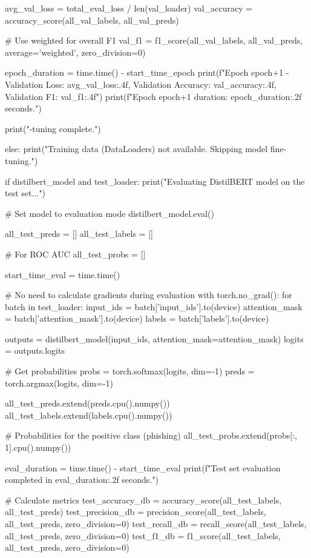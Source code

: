 \begin{ffcode}
        avg_val_loss = total_eval_loss / len(val_loader)
        val_accuracy = accuracy_score(all_val_labels, all_val_preds)

        # Use weighted for overall F1
        val_f1 = f1_score(all_val_labels, all_val_preds, average='weighted', zero_division=0)

        epoch_duration = time.time() - start_time_epoch
        print(f"Epoch {epoch+1} - Validation Loss: {avg_val_loss:.4f}, Validation Accuracy: {val_accuracy:.4f}, Validation F1: {val_f1:.4f}")
        print(f"Epoch {epoch+1} duration: {epoch_duration:.2f} seconds.")

    print("\nFine-tuning complete.")

else:
    print("Training data (DataLoaders) not available. Skipping model fine-tuning.")

if distilbert_model and test_loader:
    print("Evaluating DistilBERT model on the test set...")

    # Set model to evaluation mode
    distilbert_model.eval()

    all_test_preds = []
    all_test_labels = []

    # For ROC AUC
    all_test_probs = []

    start_time_eval = time.time()

    # No need to calculate gradients during evaluation
    with torch.no_grad():
        for batch in test_loader:
            input_ids = batch['input_ids'].to(device)
            attention_mask = batch['attention_mask'].to(device)
            labels = batch['labels'].to(device)

            outputs = distilbert_model(input_ids, attention_mask=attention_mask)
            logits = outputs.logits

            # Get probabilities
            probs = torch.softmax(logits, dim=-1)
            preds = torch.argmax(logits, dim=-1)

            all_test_preds.extend(preds.cpu().numpy())
            all_test_labels.extend(labels.cpu().numpy())

            # Probabilities for the positive class (phishing)
            all_test_probs.extend(probs[:, 1].cpu().numpy())

    eval_duration = time.time() - start_time_eval
    print(f"Test set evaluation completed in {eval_duration:.2f} seconds.")

    # Calculate metrics
    test_accuracy_db = accuracy_score(all_test_labels, all_test_preds)
    test_precision_db = precision_score(all_test_labels, all_test_preds, zero_division=0)
    test_recall_db = recall_score(all_test_labels, all_test_preds, zero_division=0)
    test_f1_db = f1_score(all_test_labels, all_test_preds, zero_division=0)


\end{ffcode}
